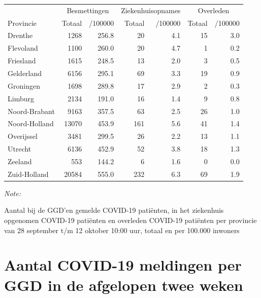 \documentclass[
  english,
  man,floatsintext]{apa6}
\begin{document}
\begin{table}[H]
\centering
\begin{threeparttable}
\begin{tabular}{lrrrrrr}
\toprule
\multicolumn{1}{c}{ } & \multicolumn{2}{c}{Besmettingen} & \multicolumn{2}{c}{Ziekenhuisopnames} & \multicolumn{2}{c}{Overleden} \\
\cmidrule(l{3pt}r{3pt}){2-3} \cmidrule(l{3pt}r{3pt}){4-5} \cmidrule(l{3pt}r{3pt}){6-7}
Provincie & Totaal & /100000 & Totaal & /100000 & Totaal & /100000\\
\midrule
Drenthe & 1268 & 256.8 & 20 & 4.1 & 15 & 3.0\\
Flevoland & 1100 & 260.0 & 20 & 4.7 & 1 & 0.2\\
Friesland & 1615 & 248.5 & 13 & 2.0 & 3 & 0.5\\
Gelderland & 6156 & 295.1 & 69 & 3.3 & 19 & 0.9\\
Groningen & 1698 & 289.8 & 17 & 2.9 & 2 & 0.3\\
Limburg & 2134 & 191.0 & 16 & 1.4 & 9 & 0.8\\
Noord-Brabant & 9163 & 357.5 & 63 & 2.5 & 26 & 1.0\\
Noord-Holland & 13070 & 453.9 & 161 & 5.6 & 41 & 1.4\\
Overijssel & 3481 & 299.5 & 26 & 2.2 & 13 & 1.1\\
Utrecht & 6136 & 452.9 & 52 & 3.8 & 18 & 1.3\\
Zeeland & 553 & 144.2 & 6 & 1.6 & 0 & 0.0\\
Zuid-Holland & 20584 & 555.0 & 232 & 6.3 & 69 & 1.9\\
\bottomrule
\end{tabular}
\begin{tablenotes}
\item \textit{Note: } 
\item Aantal bij de GGD’en gemelde COVID-19 patiënten, in het ziekenhuis opgenomen COVID-19 patiënten en overleden COVID-19 patiënten per provincie van 28 september t/m 12 oktober 10:00 uur, totaal en per 100.000 inwoners
\end{tablenotes}
\end{threeparttable}
\end{table}

\newpage

\hypertarget{aantal-covid-19-meldingen-per-ggd-in-de-afgelopen-twee-weken}{%
\section{Aantal COVID-19 meldingen per GGD in de afgelopen twee weken}\label{aantal-covid-19-meldingen-per-ggd-in-de-afgelopen-twee-weken}}
\end{document}
